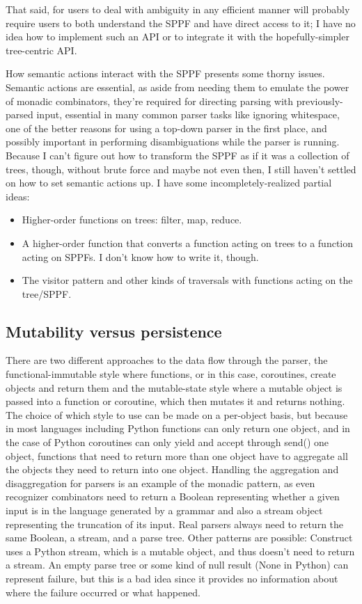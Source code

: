 \documentclass[12pt]{article}
\begin{document}
That said, for users to deal with ambiguity in any efficient manner
will probably require users to both understand the SPPF and have
direct access to it; I have no idea how to implement such an API or to
integrate it with the hopefully-simpler tree-centric API.

How semantic actions interact with the SPPF presents some thorny
issues.  Semantic actions are essential, as aside from needing them to
emulate the power of monadic combinators, they're required for
directing parsing with previously-parsed input, essential in many
common parser tasks like ignoring whitespace, one of the better reasons
for using a top-down parser in the first place, and possibly important
in performing disambiguations while the parser is running.  Because
I can't figure out how to transform the SPPF as if it was a collection
of trees, though, without brute force and maybe not even then, I still
haven't settled on how to set semantic actions up.  I have some
incompletely-realized partial ideas:

\begin{itemize}
\item Higher-order functions on trees: filter, map, reduce.
\item A higher-order function that converts a function acting on trees
  to a function acting on SPPFs.  I don't know how to write it, though.
\item The visitor pattern and other kinds of traversals with functions
  acting on the tree/SPPF.
\end{itemize}


\subsection{Mutability versus persistence}
\label{sec:mutability_persistence}

There are two different approaches to the data flow through the
parser, the functional-immutable style where functions, or in this
case, coroutines, create objects and return them and the mutable-state
style where a mutable object is passed into a function or coroutine,
which then mutates it and returns nothing.  The choice of which style
to use can be made on a per-object basis, but because in most
languages including Python functions can only return one object, and
in the case of Python coroutines can only yield and accept through
send() one object, functions that need to return more than one object
have to aggregate all the objects they need to return into one object.
Handling the aggregation and disaggregation for parsers is an example
of the monadic pattern, as even recognizer combinators need to return
a Boolean representing whether a given input is in the language
generated by a grammar and also a stream object representing the
truncation of its input.  Real parsers always need to return the same
Boolean, a stream, and a parse tree.  Other patterns are possible:
Construct uses a Python stream, which is a mutable object, and thus
doesn't need to return a stream.  An empty parse tree or some kind of
null result (None in Python) can represent failure, but this is a bad
idea since it provides no information about where the failure occurred
or what happened.
\end{document}
